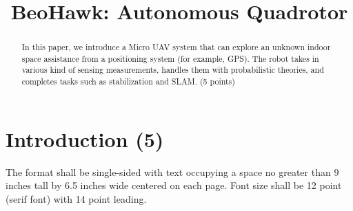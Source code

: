 \documentclass[12pt, letterpaper]{article}
\title{BeoHawk: Autonomous Quadrotor}
\begin{document}

\maketitle
\begin{people}
\end{people}

\begin{abstract}
	In this paper, we introduce a Micro UAV system that can explore an unknown indoor space assistance from a positioning system (for example, GPS). The robot takes in various kind of sensing measurements, handles them with probabilistic theories, and completes tasks such as stabilization and SLAM. (5 points)
\end{abstract}

\section{Introduction (5)}
The format shall be single-sided with text occupying a space no greater than 9 inches tall by 6.5 inches wide centered on each page. Font size shall be 12 point (serif font) with 14 point leading.
\end{document}
